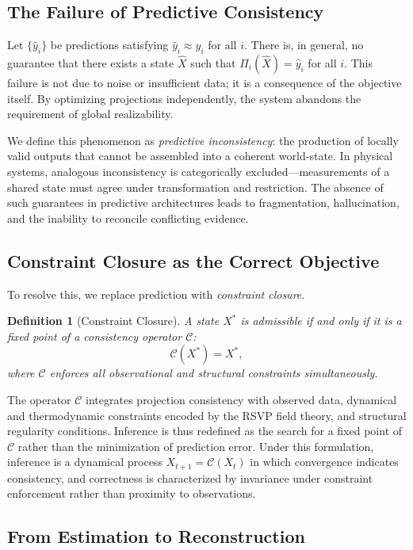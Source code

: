 \documentclass[12pt, oneside]{article}
\newtheorem{definition}{Definition}
\begin{document}
\subsection{The Failure of Predictive Consistency}

Let $\{\hat{y}_i\}$ be predictions satisfying $\hat{y}_i \approx y_i$ for all $i$. There is, in general, no guarantee that there exists a state $\hat{X}$ such that $\Pi_i(\hat{X}) = \hat{y}_i$ for all $i$. This failure is not due to noise or insufficient data; it is a consequence of the objective itself. By optimizing projections independently, the system abandons the requirement of global realizability.

We define this phenomenon as \emph{predictive inconsistency}: the production of locally valid outputs that cannot be assembled into a coherent world-state. In physical systems, analogous inconsistency is categorically excluded---measurements of a shared state must agree under transformation and restriction. The absence of such guarantees in predictive architectures leads to fragmentation, hallucination, and the inability to reconcile conflicting evidence.

\subsection{Constraint Closure as the Correct Objective}

To resolve this, we replace prediction with \emph{constraint closure}.

\begin{definition}[Constraint Closure]
A state $X^\ast$ is admissible if and only if it is a fixed point of a consistency operator $\mathcal{C}$:
\[
\mathcal{C}(X^\ast) = X^\ast,
\]
where $\mathcal{C}$ enforces all observational and structural constraints simultaneously.
\end{definition}

The operator $\mathcal{C}$ integrates projection consistency with observed data, dynamical and thermodynamic constraints encoded by the RSVP field theory, and structural regularity conditions. Inference is thus redefined as the search for a fixed point of $\mathcal{C}$ rather than the minimization of prediction error. Under this formulation, inference is a dynamical process $X_{t+1} = \mathcal{C}(X_t)$ in which convergence indicates consistency, and correctness is characterized by invariance under constraint enforcement rather than proximity to observations.

\subsection{From Estimation to Reconstruction}
\end{document}
